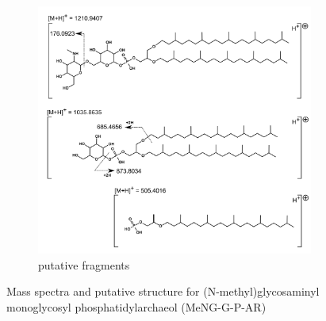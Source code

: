 \begin{figure}[h] \ContinuedFloat
    \begin{subfigure}[b]{1\linewidth}
       \includegraphics[width=\linewidth]{figs_app1/MeNG-G-P-AR_2}
       \caption{putative fragments}
        \label{fig:gull}
    \end{subfigure}
\caption{Mass spectra and putative structure for (N-methyl)glycosaminyl monoglycosyl phosphatidylarchaeol (MeNG-G-P-AR)}
\label{fig:MeNG-G-P-AR}
\end{figure}

